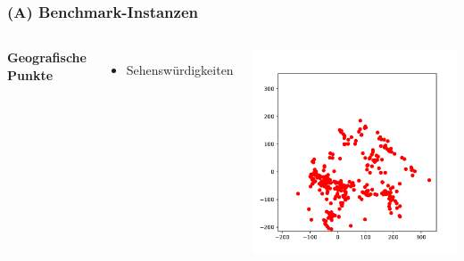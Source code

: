 \documentclass[aspectratio=169]{beamer}
\begin{document}
\begin{frame}
	\frametitle{(A) Benchmark-Instanzen}
	\begin{columns}[c] %
	
	\textbf{Geografische Punkte}
	\begin{itemize}
		\item Sehenswürdigkeiten
	\end{itemize}
	
	\includegraphics[scale=.5]{tourist.pdf}
	

	\end{columns}
	\end{frame}

\end{document}
